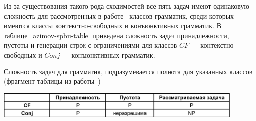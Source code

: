 Из-за существования такого рода сходимостей все пять задач имеют одинаковую сложность для рассмотренных в работе~\cite{azimov-spbu-Okhotin} классов грамматик, среди которых имеются классы контекстно-свободных и конъюнктивных грамматик. В таблице~\ref{azimov-spbu-table} приведена сложность задач принадлежности, пустоты и генерации строк с ограничениями для классов $CF$ --- контекстно-свободных и $Conj$ --- конъюнктивных грамматик.

\begin{table}[h!]
 \centering
  \caption{Сложность задач для грамматик, подразумевается полнота
для указанных классов (фрагмент таблицы из работы~\cite{azimov-spbu-Okhotin})}
 \includegraphics[width=12cm]{pictures/azimov-spbu-okhotin_tab1.png}
 \label{azimov-spbu-table}
\end{table}
